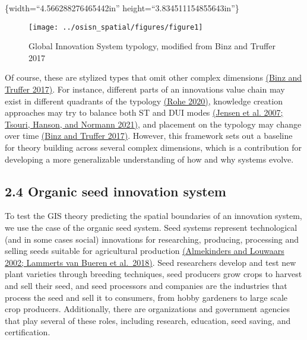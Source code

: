 \documentclass[twoside,12pt,final]{ucthesis-CA2012}
\begin{document}
\begin{ucmainmatter}
\{width=``4.566288276465442in''
height=``3.834511154855643in''\}
\begin{figure}

{\centering \texttt{[image: ../osisn\_spatial/figures/figure1]} 

}

\caption{Global Innovation System typology, modified from Binz and Truffer 2017}\label{fig:unnamed-chunk-14}
\end{figure}
Of course, these are stylized types that omit other complex dimensions
\href{https://www.zotero.org/google-docs/?qyKYFP}{(Binz and Truffer 2017)}.
For instance, different parts of an innovation\textquotesingle s value chain may exist
in different quadrants of the typology \href{https://www.zotero.org/google-docs/?q54awd}{(Rohe
2020)}, knowledge creation
approaches may try to balance both ST and DUI modes \href{https://www.zotero.org/google-docs/?nMSuJI}{(Jensen et al.
2007; Tsouri, Hanson, and Normann
2021)}, and placement on the
typology may change over time \href{https://www.zotero.org/google-docs/?3uaw1G}{(Binz and Truffer
2017)}. However, this
framework sets out a baseline for theory building across several complex
dimensions, which is a contribution for developing a more generalizable
understanding of how and why systems evolve.

\hypertarget{organic-seed-innovation-system}{%
\subsection{2.4 Organic seed innovation system}\label{organic-seed-innovation-system}}

To test the GIS theory predicting the spatial boundaries of an
innovation system, we use the case of the organic seed system. Seed
systems represent technological (and in some cases social) innovations
for researching, producing, processing and selling seeds suitable for
agricultural production \href{https://www.zotero.org/google-docs/?fCj5EV}{(Almekinders and Louwaars 2002; Lammerts van
Bueren et al.~2018)}. Seed
researchers develop and test new plant varieties through breeding
techniques, seed producers grow crops to harvest and sell their seed,
and seed processors and companies are the industries that process the
seed and sell it to consumers, from hobby gardeners to large scale crop
producers. Additionally, there are organizations and government agencies
that play several of these roles, including research, education, seed
saving, and certification.


\end{ucmainmatter}
\end{document}
